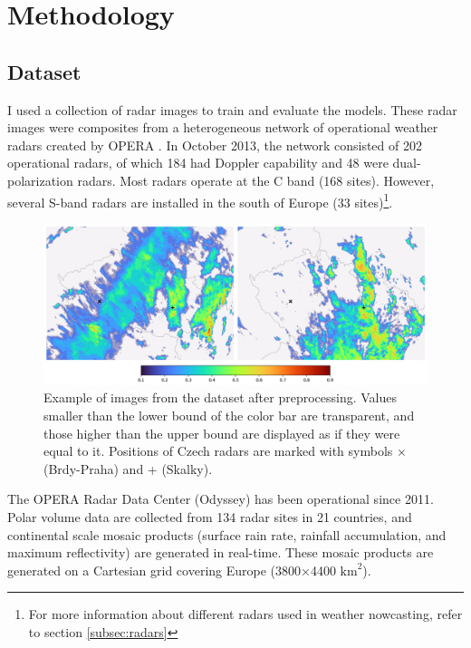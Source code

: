 \chapter{Methodology}
\label{chap:methodology}


\section{Dataset}
\label{sec:dataset_description}

I used a collection of radar images to train and evaluate the models. These radar images were composites from a heterogeneous network of operational weather radars created by \gls{OPERA} \cite{weatherradar}. In October 2013, the network consisted of 202 operational radars, of which 184 had Doppler capability and 48 were dual-polarization radars. Most radars operate at the C band (168 sites). However, several S-band radars are installed in the south of Europe (33 sites)\footnote{For more information about different radars used in weather nowcasting, refer to section \ref{subsec:radars}}.

\begin{figure}[ht]
    \centering
    \includegraphics[width=\textwidth]{images/radar_image_with_map.png}
    \caption[Example of radar images from the dataset]{\label{fig:radar_image_with_map}Example of images from the dataset after preprocessing. Values smaller than the lower bound of the color bar are transparent, and those higher than the upper bound are displayed as if they were equal to it. Positions of Czech radars are marked with symbols × (Brdy-Praha) and + (Skalky).}
\end{figure}

The \gls{OPERA} Radar Data Center (Odyssey) has been operational since 2011. Polar volume data are collected from 134 radar sites in 21 countries, and continental scale mosaic products (surface rain rate, rainfall accumulation, and maximum reflectivity) are generated in real-time. These mosaic products are generated on a Cartesian grid covering Europe (3800×4400 $\text{km}^2$). \cite{weatherradar}

